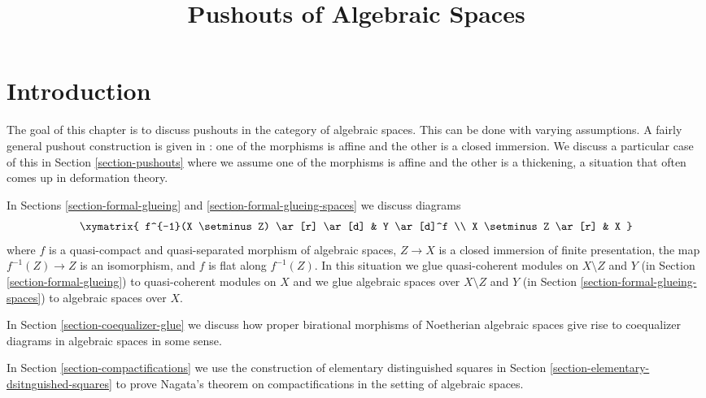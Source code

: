 

%


\title{Pushouts of Algebraic Spaces}


\maketitle

\label{section-phantom}

\tableofcontents

\section{Introduction}
\label{section-introduction}

\noindent
The goal of this chapter is to discuss pushouts in the category of
algebraic spaces. This can be done with varying assumptions.
A fairly general pushout construction is given in \cite{Temkin-Tyomkin}:
one of the morphisms is affine and the other is a closed immersion.
We discuss a particular case of this in Section \ref{section-pushouts}
where we assume one of the morphisms is affine and the other is a
thickening, a situation that often comes up in deformation theory.

\medskip\noindent
In Sections \ref{section-formal-glueing} and
\ref{section-formal-glueing-spaces} we discuss diagrams
$$
\xymatrix{
f^{-1}(X \setminus Z) \ar[r] \ar[d] & Y \ar[d]^f \\
X \setminus Z \ar[r] & X
}
$$
where $f$ is a quasi-compact and quasi-separated morphism of
algebraic spaces, $Z \to X$ is a closed immersion of finite presentation,
the map $f^{-1}(Z) \to Z$ is an isomorphism, and
$f$ is flat along $f^{-1}(Z)$. In this situation we glue
quasi-coherent modules on $X \setminus Z$ and $Y$
(in Section \ref{section-formal-glueing}) to quasi-coherent modules on $X$
and we glue algebraic spaces over $X \setminus Z$ and $Y$
(in Section \ref{section-formal-glueing-spaces}) to algebraic spaces over $X$.

\medskip\noindent
In Section \ref{section-coequalizer-glue} we discuss how proper birational
morphisms of Noetherian algebraic spaces give rise to coequalizer diagrams
in algebraic spaces in some sense.

\medskip\noindent
In Section \ref{section-compactifications} we use the construction
of elementary distinguished squares
in Section \ref{section-elementary-dsitnguished-squares}
to prove Nagata's theorem on compactifications in the setting
of algebraic spaces.





